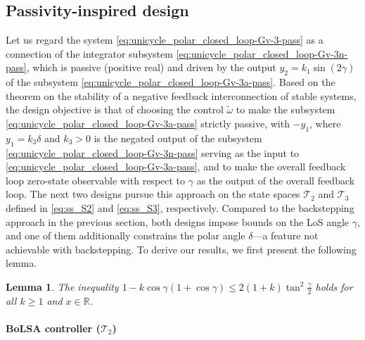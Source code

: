 \documentclass[letterpaper, 10 pt, conference]{ieeeconf}  %
\newtheorem{lemma}{Lemma}
\begin{document}
\subsection{Passivity-inspired design}

Let us regard the system \eqref{eq:unicycle_polar_closed_loop-Gv-3-pass} as a connection of the integrator subsystem \eqref{eq:unicycle_polar_closed_loop-Gv-3n-pass}, which is passive (positive real) and driven by the output $y_2={k_1} \sin(2\gamma)$ of the subsystem \eqref{eq:unicycle_polar_closed_loop-Gv-3a-pass}. Based on the theorem on the stability of a negative feedback interconnection of stable systems, the design objective is that of choosing the control $\tilde\omega$ to make the subsystem \eqref{eq:unicycle_polar_closed_loop-Gv-3a-pass} strictly passive, with $-y_1$, where $y_1 = k_3\delta$ and $k_3>0$ is the negated output of the subsystem \eqref{eq:unicycle_polar_closed_loop-Gv-3n-pass} serving as the input to \eqref{eq:unicycle_polar_closed_loop-Gv-3a-pass}, and to make the overall feedback loop zero-state observable with respect to $\gamma$ as the output of the overall feedback loop. The next two designs pursue this approach on the state spaces $\mathcal{T}_2$ and $\mathcal{T}_3$ defined in \eqref{eq:ss_S2} and \eqref{eq:ss_S3}, respectively. Compared to the backstepping approach in the previous section, both designs impose bounds on the LoS angle $\gamma$, and one of them additionally constrains the polar angle $\delta$—a feature not achievable with backstepping. To derive our results, we first present the following lemma.

\begin{lemma}\label{lemma:sinterm_upperbound}
The inequality $1- k \cos\gamma(1+\cos\gamma) \leq 2 (1 + k)  \tan^2\frac{\gamma}{2}$ holds for all $k\geq 1$ and $x\in\mathbb{R}$.
\end{lemma}

\paragraph{BoLSA controller ($\mathcal{T}_2$)} 
\end{document}
